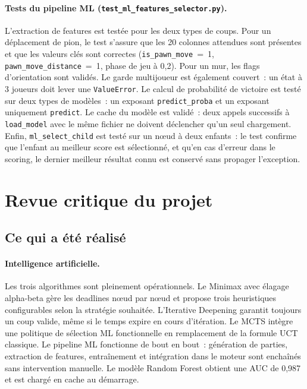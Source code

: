 \documentclass[a4paper]{article}
\begin{document}
\paragraph{Tests du pipeline ML (\texttt{test\_ml\_features\_selector.py}).}
L'extraction de features est testée pour les deux types de coups. Pour un
déplacement de pion, le test s'assure que les 20 colonnes attendues sont
présentes et que les valeurs clés sont correctes (\texttt{is\_pawn\_move}~=~1,
\texttt{pawn\_move\_distance}~=~1, phase de jeu à 0,2). Pour un mur, les flags
d'orientation sont validés. Le garde multijoueur est également couvert~: un
état à 3 joueurs doit lever une \texttt{ValueError}. Le calcul de probabilité
de victoire est testé sur deux types de modèles~: un exposant \texttt{predict\_proba}
et un exposant uniquement \texttt{predict}. Le cache du modèle est validé~:
deux appels successifs à \texttt{load\_model} avec le même fichier ne doivent
déclencher qu'un seul chargement. Enfin, \texttt{ml\_select\_child} est testé
sur un nœud à deux enfants~: le test confirme que l'enfant au meilleur score
est sélectionné, et qu'en cas d'erreur dans le scoring, le dernier meilleur
résultat connu est conservé sans propager l'exception.

\section*{Revue critique du projet}

\subsection*{Ce qui a été réalisé}

\paragraph{Intelligence artificielle.}
Les trois algorithmes sont pleinement opérationnels. Le Minimax avec élagage
alpha-beta gère les deadlines nœud par nœud et propose trois heuristiques
configurables selon la stratégie souhaitée. L’Iterative Deepening garantit
toujours un coup valide, même si le temps expire en cours d’itération. Le MCTS
intègre une politique de sélection ML fonctionnelle en remplacement de la
formule UCT classique. Le pipeline ML fonctionne de bout en bout~: génération
de parties, extraction de features, entraînement et intégration dans le moteur
sont enchaînés sans intervention manuelle. Le modèle Random Forest obtient une
AUC de 0,987 et est chargé en cache au démarrage.
\end{document}
